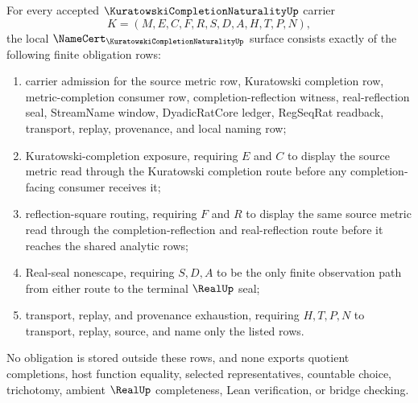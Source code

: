 \begin{theorem}
\label{thm:kuratowski-completion-naturality-namecert-obligations}
For every accepted $\KuratowskiCompletionNaturalityUp$ carrier
$$
K=(M,E,C,F,R,S,D,A,H,T,P,N),
$$
the local $\NameCert_{\KuratowskiCompletionNaturalityUp}$ surface consists exactly of the following finite obligation rows:
\begin{enumerate}
\item carrier admission for the source metric row, Kuratowski completion row, metric-completion consumer row, completion-reflection witness, real-reflection seal, StreamName window, DyadicRatCore ledger, RegSeqRat readback, transport, replay, provenance, and local naming row;
\item Kuratowski-completion exposure, requiring $E$ and $C$ to display the source metric read through the Kuratowski completion route before any completion-facing consumer receives it;
\item reflection-square routing, requiring $F$ and $R$ to display the same source metric read through the completion-reflection and real-reflection route before it reaches the shared analytic rows;
\item Real-seal nonescape, requiring $S,D,A$ to be the only finite observation path from either route to the terminal $\RealUp$ seal;
\item transport, replay, and provenance exhaustion, requiring $H,T,P,N$ to transport, replay, source, and name only the listed rows.
\end{enumerate}
No obligation is stored outside these rows, and none exports quotient completions, host function equality, selected representatives, countable choice, trichotomy, ambient $\RealUp$ completeness, Lean verification, or bridge checking.
\end{theorem}
